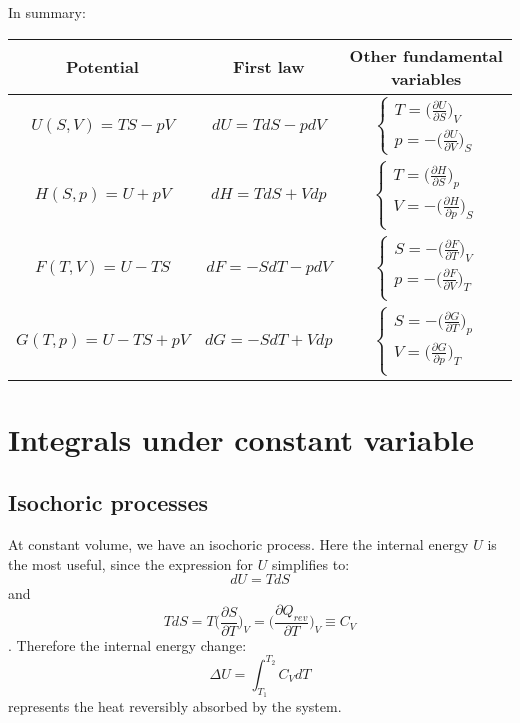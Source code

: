 \documentclass[a4paper,11pt,oneside]{book}
\begin{document}
In summary:
{\renewcommand{\arraystretch}{3}
\begin{table}[h!]
    \centering
    \begin{tabular}{c|c|c}
      Potential & First law & Other fundamental variables \\
      \hline \hline 
       $U(S,V) = TS-pV$  &  $dU = TdS - pdV$ &  $\begin{cases}
    T = \big(\frac{\partial U}{\partial S}\big)_V \\
    p = -\big(\frac{\partial U}{\partial V}\big)_S
    \end{cases}$\\
    $H(S,p)=U+pV$ & $dH = TdS+Vdp$ &    $\begin{cases}
    T = \big(\frac{\partial H}{\partial S}\big)_p \\
    V = -\big(\frac{\partial H}{\partial p}\big)_S\\
\end{cases}$\\
$F(T,V) = U-TS$ & $dF = -SdT - pdV$ & $\begin{cases}
    S = -\big(\frac{\partial F}{\partial T}\big)_V \\
    p = -\big(\frac{\partial F}{\partial V}\big)_T\\
\end{cases}$\\
$G(T,p)=U-TS+pV$ & $dG = -SdT + Vdp$ & $\begin{cases}
    S = -\big(\frac{\partial G}{\partial T}\big)_p \\
    V = \big(\frac{\partial G}{\partial p}\big)_T\\
\end{cases}$
    \end{tabular}
    \label{tab:my_label}
\end{table}}
\section{Integrals under constant variable}
\subsection*{Isochoric processes}
At constant volume, we have an isochoric process. Here the internal energy $U$ is the most useful, since the expression for $U$ simplifies to:
\begin{equation}
    dU = TdS 
\end{equation}
and \begin{equation}
    T dS = T \bigg(\frac{\partial S}{\partial T}\bigg)_V = \bigg(\frac{\partial Q_{rev}}{\partial T}\bigg)_V \equiv C_V
\end{equation}. Therefore the internal energy change:
\begin{equation}
    \Delta U = \int_{T_1}^{T_2} C_V dT  
\end{equation}
represents the heat reversibly absorbed by the system. 
\end{document}
